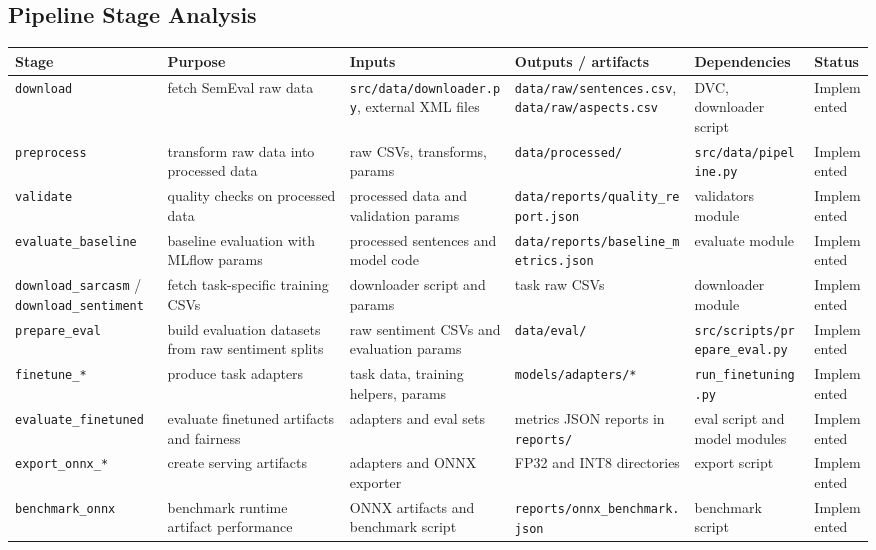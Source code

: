 \subsection{Pipeline Stage Analysis}
\begin{longtable}{@{}p{}p{}p{}p{}p{}p{}@{}}
\toprule
\textbf{Stage} & \textbf{Purpose} & \textbf{Inputs} & \textbf{Outputs / artifacts} & \textbf{Dependencies} & \textbf{Status} \\
\midrule
\endhead
\texttt{download} & fetch SemEval raw data & \texttt{src/data/downloader.py}, external XML files & \texttt{data/raw/sentences.csv}, \texttt{data/raw/aspects.csv} & DVC, downloader script & Implemented \\
\texttt{preprocess} & transform raw data into processed data & raw CSVs, transforms, params & \texttt{data/processed/} & \texttt{src/data/pipeline.py} & Implemented \\
\texttt{validate} & quality checks on processed data & processed data and validation params & \texttt{data/reports/quality\_report.json} & validators module & Implemented \\
\texttt{evaluate\_baseline} & baseline evaluation with MLflow params & processed sentences and model code & \texttt{data/reports/baseline\_metrics.json} & evaluate module & Implemented \\
\texttt{download\_sarcasm} / \texttt{download\_sentiment} & fetch task-specific training CSVs & downloader script and params & task raw CSVs & downloader module & Implemented \\
\texttt{prepare\_eval} & build evaluation datasets from raw sentiment splits & raw sentiment CSVs and evaluation params & \texttt{data/eval/} & \texttt{src/scripts/prepare\_eval.py} & Implemented \\
\texttt{finetune\_*} & produce task adapters & task data, training helpers, params & \texttt{models/adapters/*} & \texttt{run\_finetuning.py} & Implemented \\
\texttt{evaluate\_finetuned} & evaluate finetuned artifacts and fairness & adapters and eval sets & metrics JSON reports in \texttt{reports/} & eval script and model modules & Implemented \\
\texttt{export\_onnx\_*} & create serving artifacts & adapters and ONNX exporter & FP32 and INT8 directories & export script & Implemented \\
\texttt{benchmark\_onnx} & benchmark runtime artifact performance & ONNX artifacts and benchmark script & \texttt{reports/onnx\_benchmark.json} & benchmark script & Implemented \\
\bottomrule
\end{longtable}

